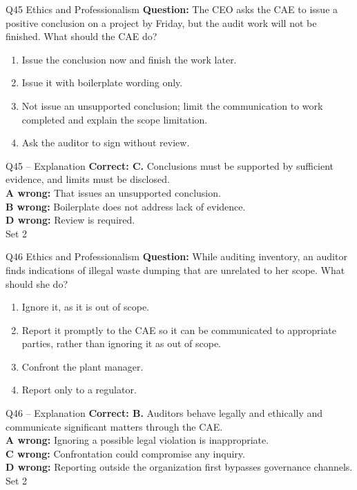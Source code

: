 \documentclass[aspectratio=169,10pt]{beamer}
\begin{document}
\begin{frame}[t]{Q45 \hfill {\scriptsize Ethics and Professionalism}}
	\small
	\textbf{Question:} The CEO asks the CAE to issue a positive conclusion on a project by Friday, but the audit work will not be finished. What should the CAE do?
	\begin{enumerate}[label=\Alph*.,itemsep=1pt,topsep=3pt]
			\item Issue the conclusion now and finish the work later.
			\item Issue it with boilerplate wording only.
			\item Not issue an unsupported conclusion; limit the communication to work completed and explain the scope limitation.
			\item Ask the auditor to sign without review.
	\end{enumerate}
\end{frame}

\begin{frame}[t]{Q45 -- Explanation}
	\footnotesize
	\textbf{Correct: C.} Conclusions must be supported by sufficient evidence, and limits must be disclosed. \\[5pt]
\textbf{A wrong:} That issues an unsupported conclusion. \\[3pt]
\textbf{B wrong:} Boilerplate does not address lack of evidence. \\[3pt]
\textbf{D wrong:} Review is required. \\[3pt]
	\vfill {\tiny Set 2}
\end{frame}

\begin{frame}[t]{Q46 \hfill {\scriptsize Ethics and Professionalism}}
	\small
	\textbf{Question:} While auditing inventory, an auditor finds indications of illegal waste dumping that are unrelated to her scope. What should she do?
	\begin{enumerate}[label=\Alph*.,itemsep=1pt,topsep=3pt]
			\item Ignore it, as it is out of scope.
			\item Report it promptly to the CAE so it can be communicated to appropriate parties, rather than ignoring it as out of scope.
			\item Confront the plant manager.
			\item Report only to a regulator.
	\end{enumerate}
\end{frame}

\begin{frame}[t]{Q46 -- Explanation}
	\footnotesize
	\textbf{Correct: B.} Auditors behave legally and ethically and communicate significant matters through the CAE. \\[5pt]
\textbf{A wrong:} Ignoring a possible legal violation is inappropriate. \\[3pt]
\textbf{C wrong:} Confrontation could compromise any inquiry. \\[3pt]
\textbf{D wrong:} Reporting outside the organization first bypasses governance channels. \\[3pt]
	\vfill {\tiny Set 2}
\end{frame}
\end{document}
